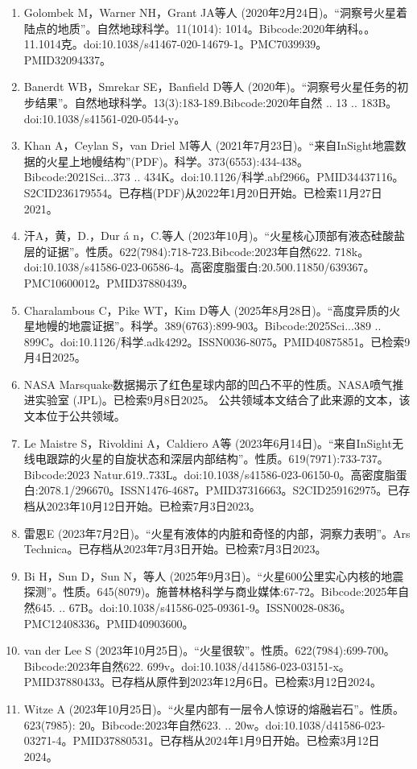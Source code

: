 \begin{enumerate}
\item Golombek M，Warner NH，Grant JA等人 (2020年2月24日)。“洞察号火星着陆点的地质”。自然地球科学。11(1014): 1014。Bibcode:2020年纳科。。11.1014克。doi:10.1038/s41467-020-14679-1。PMC7039939。PMID32094337。   
\item Banerdt WB，Smrekar SE，Banfield D等人 (2020年)。“洞察号火星任务的初步结果”。自然地球科学。13(3):183-189.Bibcode:2020年自然 .. 13 .. 183B。doi:10.1038/s41561-020-0544-y。
\item Khan A，Ceylan S，van Driel M等人 (2021年7月23日)。“来自InSight地震数据的火星上地幔结构”(PDF)。科学。373(6553):434-438。Bibcode:2021Sci...373 .. 434K。doi:10.1126/科学.abf2966。PMID34437116。S2CID236179554。已存档(PDF)从2022年1月20日开始。已检索11月27日2021。   
\item 汗A，黄，D.，Dur á n，C.等人 (2023年10月)。“火星核心顶部有液态硅酸盐层的证据”。性质。622(7984):718-723.Bibcode:2023年自然622. 718k。doi:10.1038/s41586-023-06586-4。高密度脂蛋白:20.500.11850/639367。PMC10600012。PMID37880439。   
\item Charalambous C，Pike WT，Kim D等人 (2025年8月28日)。“高度异质的火星地幔的地震证据”。科学。389(6763):899-903。Bibcode:2025Sci...389 .. 899C。doi:10.1126/科学.adk4292。ISSN0036-8075。PMID40875851。已检索9月4日2025。   
\item NASA Marsquake数据揭示了红色星球内部的凹凸不平的性质。NASA喷气推进实验室 (JPL)。已检索9月8日2025。 公共领域本文结合了此来源的文本，该文本位于公共领域。
\item Le Maistre S，Rivoldini A，Caldiero A等 (2023年6月14日)。“来自InSight无线电跟踪的火星的自旋状态和深层内部结构”。性质。619(7971):733-737。Bibcode:2023 Natur.619..733L。doi:10.1038/s41586-023-06150-0。高密度脂蛋白:2078.1/296670。ISSN1476-4687。PMID37316663。S2CID259162975。已存档从2023年10月12日开始。已检索7月3日2023。   
\item 雷恩E (2023年7月2日)。“火星有液体的内脏和奇怪的内部，洞察力表明”。Ars Technica。已存档从2023年7月3日开始。已检索7月3日2023。
\item Bi H，Sun D，Sun N，等人 (2025年9月3日)。“火星600公里实心内核的地震探测”。性质。645(8079)。施普林格科学与商业媒体:67-72。Bibcode:2025年自然645. .. 67B。doi:10.1038/s41586-025-09361-9。ISSN0028-0836。PMC12408336。PMID40903600。    
\item van der Lee S (2023年10月25日)。“火星很软”。性质。622(7984):699-700。Bibcode:2023年自然622. 699v。doi:10.1038/d41586-023-03151-x。PMID37880433。已存档从原件到2023年12月6日。已检索3月12日2024。 
\item Witze A (2023年10月25日)。“火星内部有一层令人惊讶的熔融岩石”。性质。623(7985): 20。Bibcode:2023年自然623. .. 20w。doi:10.1038/d41586-023-03271-4。PMID37880531。已存档从2024年1月9日开始。已检索3月12日2024。 

\end{enumerate}
